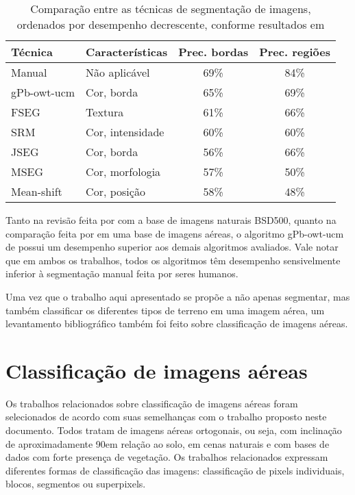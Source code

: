 \begin{table}[h]
\ABNTEXfontereduzida
\centering
\begin{tabulary}{\linewidth}{|L|L|C|C|}
\hline
\textbf{Técnica} & \textbf{Características} & \textbf{Prec. bordas} & \textbf{Prec. regiões } \\ \hline
Manual      & Não aplicável    & 69\% & 84\% \\ \hline
gPb-owt-ucm & Cor, borda       & 65\% & 69\% \\ \hline
FSEG        & Textura          & 61\% & 66\% \\ \hline
SRM         & Cor, intensidade & 60\% & 60\% \\ \hline
JSEG        & Cor, borda       & 56\% & 66\% \\ \hline
MSEG        & Cor, morfologia  & 57\% & 50\% \\ \hline
Mean-shift  & Cor, posição     & 58\% & 48\% \\ \hline
\end{tabulary}
\caption{Comparação entre as técnicas de segmentação de imagens, ordenados por desempenho decrescente, conforme resultados em  }
\label{tab:sumarioSegmentacao}
\end{table}

Tanto na revisão feita por  com a base de imagens naturais BSD500, quanto na comparação feita por  em uma base de imagens aéreas, o algoritmo gPb-owt-ucm de  possui um desempenho superior aos demais algoritmos avaliados. Vale notar que em ambos os trabalhos, todos os algoritmos têm desempenho sensivelmente inferior à segmentação manual feita por seres humanos. 

Uma vez que o trabalho aqui apresentado se propõe a não apenas segmentar, mas também classificar os diferentes tipos de terreno em uma imagem aérea, um levantamento bibliográfico também foi feito sobre classificação de imagens aéreas.

\section{Classificação de imagens aéreas}\label{sec:trClassificacao}

Os trabalhos relacionados sobre classificação de imagens aéreas foram selecionados de acordo com suas semelhanças com o trabalho proposto neste documento. Todos tratam de imagens aéreas ortogonais, ou seja, com inclinação de aproximadamente 90\degree em relação ao solo, em cenas naturais e com bases de dados com forte presença de vegetação. Os trabalhos relacionados expressam diferentes formas de classificação das imagens: classificação de pixels individuais, blocos, segmentos ou superpixels.

